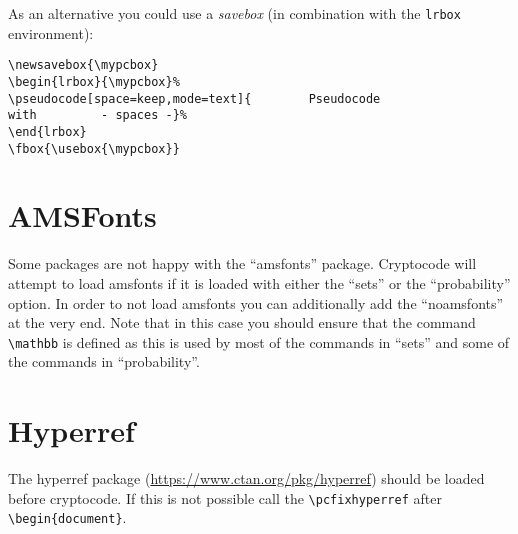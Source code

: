 \documentclass[a4paper]{report}
\begin{document}
As an alternative you could use a \emph{savebox} (in combination with the \lstinline$lrbox$ environment):

\newsavebox{\mypcbox}
\begin{lrbox}{\mypcbox}%
%
\end{lrbox}
\fbox{\usebox{\mypcbox}}

\begin{lstlisting}
\newsavebox{\mypcbox}
\begin{lrbox}{\mypcbox}%
\pseudocode[space=keep,mode=text]{        Pseudocode                with         - spaces -}%
\end{lrbox}
\fbox{\usebox{\mypcbox}}
\end{lstlisting}

\section{AMSFonts}
Some packages are not happy with the \enquote{amsfonts} package. Cryptocode will attempt to load amsfonts if it is loaded
with either the \enquote{sets} or the \enquote{probability} option. In order to not load amsfonts you can additionally add the
\enquote{noamsfonts} at the very end. Note that in this case you should ensure that the command \lstinline$\mathbb$ is defined
as this is used by most of the commands in \enquote{sets} and some of the commands in \enquote{probability}.

\section{Hyperref}
The hyperref package (\url{https://www.ctan.org/pkg/hyperref}) should be loaded before cryptocode. If this is not possible
call the \lstinline$\pcfixhyperref$ after \lstinline$\begin{document}$.

\printindex
\end{document}
